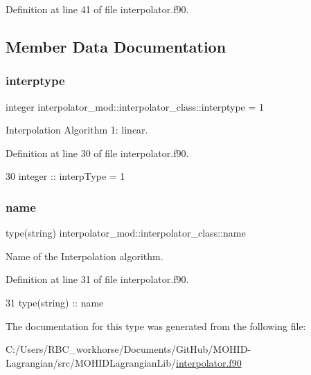 Definition at line 41 of file interpolator.\+f90.



\subsection{Member Data Documentation}
\mbox{\label{structinterpolator__mod_1_1interpolator__class_afdfac8b305fd660e113fcc4b2145a8da}} 
\subsubsection{\texorpdfstring{interptype}{interptype}}
{\footnotesize\ttfamily integer interpolator\+\_\+mod\+::interpolator\+\_\+class\+::interptype = 1\hspace{0.3cm}{\ttfamily [private]}}



Interpolation Algorithm 1\+: linear. 



Definition at line 30 of file interpolator.\+f90.


\begin{DoxyCode}
30         \textcolor{keywordtype}{integer} :: interpType = 1
\end{DoxyCode}
\mbox{\label{structinterpolator__mod_1_1interpolator__class_ac0d7be3d07fb72dec420461e031d6983}} 
\subsubsection{\texorpdfstring{name}{name}}
{\footnotesize\ttfamily type(string) interpolator\+\_\+mod\+::interpolator\+\_\+class\+::name\hspace{0.3cm}{\ttfamily [private]}}



Name of the Interpolation algorithm. 



Definition at line 31 of file interpolator.\+f90.


\begin{DoxyCode}
31         \textcolor{keywordtype}{type}(string) :: name
\end{DoxyCode}


The documentation for this type was generated from the following file\+:\begin{DoxyCompactItemize}
\item 
C\+:/\+Users/\+R\+B\+C\+\_\+workhorse/\+Documents/\+Git\+Hub/\+M\+O\+H\+I\+D-\/\+Lagrangian/src/\+M\+O\+H\+I\+D\+Lagrangian\+Lib/\mbox{\hyperlink{interpolator_8f90}{interpolator.\+f90}}\end{DoxyCompactItemize}
